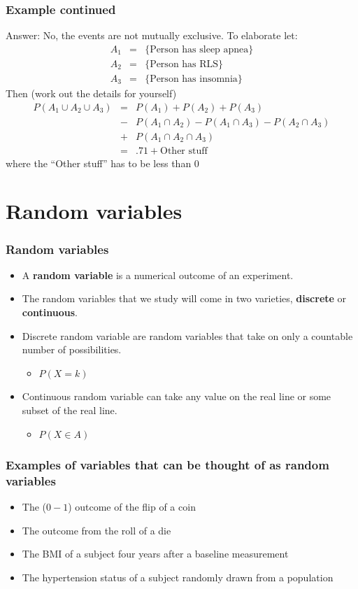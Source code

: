 \documentclass{beamer}
\begin{document}
\begin{frame} \frametitle{Example continued}
  Answer: No, the events are not mutually exclusive. To elaborate let:
  \begin{eqnarray*}
    A_1 & = & \{\mbox{Person has sleep apnea}\} \\
    A_2 & = & \{\mbox{Person has RLS}\} \\
    A_3 & = & \{\mbox{Person has insomnia}\}
  \end{eqnarray*}
  Then (work out the details for yourself)
  \begin{eqnarray*}
    P(A_1 \cup A_2 \cup A_3) & = & P(A_1) + P(A_2) + P(A_3) \\
   & - & P(A_1 \cap A_2) - P(A_1 \cap A_3) - P(A_2 \cap A_3) \\
   & + & P(A_1 \cap A_2 \cap A_3) \\
   & = & .71 + \mbox{Other stuff}
  \end{eqnarray*}
where the ``Other stuff'' has to be less than $0$
\end{frame}


\section{Random variables}
\begin{frame}
\frametitle{Random variables}
\begin{itemize}
\item A {\bf random variable} is a numerical outcome of an experiment.
\item The random variables that we study will come in two varieties,
  {\bf discrete} or {\bf continuous}.
\item Discrete random variable are random variables that take on only a
countable number of possibilities.
\begin{itemize}{}
\item $P(X = k)$
\end{itemize}
\item Continuous random variable can take any value on the real line or some
subset of the real line.
\begin{itemize}{}
\item $P(X \in A)$
\end{itemize}
\end{itemize}
\end{frame}

\begin{frame}
\frametitle{Examples of variables that can be thought of as random variables}
\begin{itemize}
\item The ($0-1$) outcome of the flip of a coin
\item The outcome from the roll of a die
\item The BMI of a subject four years after a baseline measurement
\item The hypertension status of a subject randomly drawn from a population
\end{itemize}
\end{frame}
\end{document}
